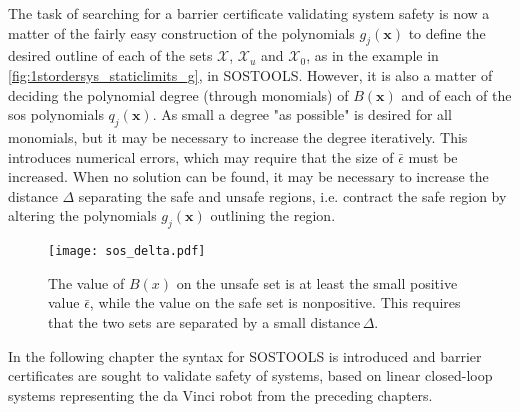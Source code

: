 The task of searching for a barrier certificate validating system safety is now a matter of the fairly easy construction of the polynomials $g_j(\mathbf{x})$ to define the desired outline of each of the sets $\mathcal{X}$, $\mathcal{X}_u$ and $\mathcal{X}_0$, as in the example in \autoref{fig:1stordersys_staticlimits_g}, in SOSTOOLS. However, it is also a matter of deciding the polynomial degree (through monomials) of $B(\mathbf{x})$ and of each of the \gls{sos} polynomials $q_j(\mathbf{x})$. As small a degree "as possible" is desired for all monomials, but it may be necessary to increase the degree iteratively. This introduces numerical errors, which may require that the size of $\bar{\epsilon}$ must be increased. When no solution can be found, it may be necessary to increase the  distance $\Delta$ separating the safe and unsafe regions, i.e. contract the safe region by altering the polynomials $g_j(\mathbf{x})$ outlining the region.


\begin{figure}[H]
\centering\hspace{10mm}
\texttt{[image: sos\_delta.pdf]}
\caption{The value of $B(x)$ on the unsafe set is at least the small positive value $\bar{\epsilon}$, while the value on the safe set is nonpositive. This requires that the two sets are separated by a small distance\,$\Delta$.}
	\label{fig:sos_delta1}
\end{figure}

In the following chapter the syntax for SOSTOOLS is introduced and barrier certificates are sought to validate safety of systems, based on linear closed-loop systems representing the da Vinci robot from the preceding chapters.

 
	


%

